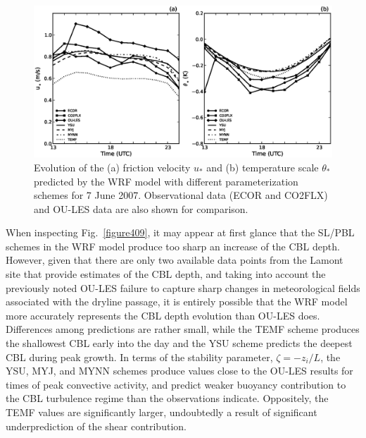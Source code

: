 \begin{figure}[ht!]
\begin{center}
\includegraphics[width=\textwidth]{figures/chapter4/ust_tst_phys_20070607}
\end{center}
\caption{Evolution of the (a) friction velocity $u_*$ and (b) temperature scale $\theta_*$ predicted by the WRF model with different parameterization schemes for 7 June 2007. Observational data (ECOR and CO2FLX) and OU-LES data are also shown for comparison.}
\label{figure408}
\end{figure}


When inspecting Fig.~\ref{figure409}, it may appear at first glance that the SL\slash PBL schemes in the WRF model produce too sharp an increase of the CBL depth. However, given that there are only two available data points from the Lamont site that provide estimates of the CBL depth, and taking into account the previously noted OU-LES failure to capture sharp changes in meteorological fields associated with the dryline passage, it is entirely possible that the WRF model more accurately represents the CBL depth evolution than OU-LES does. Differences among predictions are rather small, while the TEMF scheme produces the shallowest CBL early into the day and the YSU scheme predicts the deepest CBL during peak growth. In terms of the stability parameter, $\zeta = -z_i / L$, the YSU, MYJ, and MYNN schemes produce values close to the OU-LES results for times of peak convective activity, and predict weaker buoyancy contribution to the CBL turbulence regime than the observations indicate. Oppositely, the TEMF values are significantly larger, undoubtedly a result of significant underprediction of the shear contribution. 


